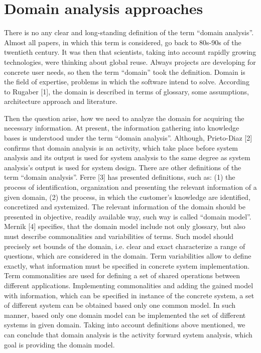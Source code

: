 \documentclass[conference]{IEEEtran}
\begin{document}
\section{Domain analysis approaches}
\label{chapter:approaches}
There is no any clear and long-standing definition of the term ``domain analysis''. Almost all papers, in which this term is considered, go back to 80s-90s of the twentieth century. It was then that scientists, taking into account rapidly growing technologies, were thinking about global reuse. Always projects are developing for concrete user needs, so then the term ``domain'' took the definition. Domain is the field of expertise, problems in which the software intend to solve. According to Rugaber [1], the domain is described in terms of glossary, some assumptions, architecture approach and literature. 

Then the question arise, how we need to analyze the domain for acquiring the necessary information. At present, the information gathering into knowledge bases is understood under the term ``domain analysis''. Although, Prieto-Diaz [2] confirms that domain analysis is an activity, which take place before system analysis and its output is used for system analysis to the same degree as system analysis’s output is used for system design.  There are other definitions of the term ``domain analysis''. Ferre [3] has presented definitions, such as: (1) the process of identification, organization and presenting the relevant information of a given domain, (2) the process, in which the customer’s knowledge are identified, concretized and systemized. The relevant information of the domain should be presented in objective, readily available way, such way is called ``domain model''. Mernik [4] specifies, that the domain model include not only glossary, but also must describe commonalities and variabilities of terms. Such model should precisely set bounds of the domain, i.e. clear and exact characterize a range of questions, which are considered in the domain. Term variabilities allow to define exactly, what information must be specified in concrete system implementation. Term commonalities are used for defining a set of shared operations between different applications. Implementing commonalities and adding the gained model  with information, which can be specified in instance of the concrete system, a set of different system can be obtained based only one common model. In such manner, based only one domain model can be implemented the set of different systems in given domain. Taking into account definitions above mentioned, we can conclude that domain analysis is the activity forward system analysis, which goal is providing the domain model. 
\end{document}
